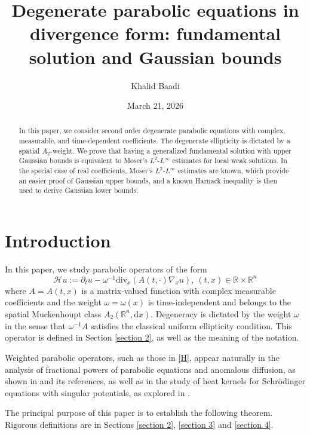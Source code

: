 \documentclass[12pt, letterpaper]{amsart}
\author{Khalid Baadi}
\date{March 21, 2026}
\title[fundamental solution and Gaussian bounds]{Degenerate parabolic equations in divergence form: fundamental solution and Gaussian bounds}
\theoremstyle{definition}
\theoremstyle{remark}
\numberwithin{equation}{section}
\begin{document}
\begin{abstract}
In this paper, we consider second order degenerate parabolic equations with complex, measurable, and time-dependent coefficients. The degenerate ellipticity is dictated by a spatial $A_2$-weight. We prove that having a generalized fundamental solution with upper Gaussian bounds is equivalent to Moser’s $L^2$-$L^\infty$ estimates for local weak solutions. In the special case of real coefficients, Moser's $L^2$-$L^\infty$ estimates are known, which provide an easier proof of Gaussian upper bounds, and a known Harnack inequality is then used to derive Gaussian lower bounds.
\end{abstract}
\maketitle


\tableofcontents





\section{Introduction}\label{section 1}
In this paper, we study parabolic operators of the form 
\begin{equation}\label{H}
    \mathcal{H}u:=  \partial_t u -\omega^{-1} \mathrm{div}_x(A(t,\cdot)\nabla_x u), \ (t,x)\in \mathbb{R}\times \mathbb{R}^n
\end{equation}
where $A=A(t,x)$ is a  matrix-valued function with complex measurable coefficients and the weight $\omega=\omega(x)$ is time-independent and belongs to the spatial Muckenhoupt class $A_2(\mathbb{R}^n,\mathrm{d}x)$. Degeneracy is dictated by the weight $\omega$ in the sense that $\omega^{-1}A$ satisfies the classical uniform ellipticity condition. This operator is defined in Section \ref{section 2}, as well as the meaning of the notation.

Weighted parabolic operators, such as those in \eqref{H}, appear naturally in the analysis of fractional powers of parabolic equations and anomalous diffusion, as shown in \cite{litsgaard2023local} and its references, as well as in the study of heat kernels for Schrödinger equations with singular potentials, as explored in \cite{ishige2017heat}.


 
The principal purpose of this paper is to establish the following theorem. Rigorous definitions are in Sections \ref{section 2}, \ref{section 3} and \ref{section 4}.
\end{document}
